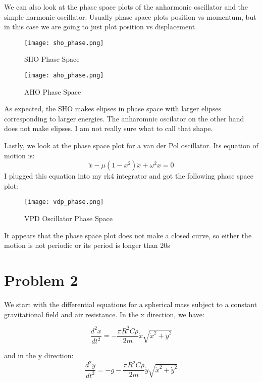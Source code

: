 \documentclass{article}
\begin{document}
We can also look at the phase space plots of the anharmonic oscillator and the simple harmonic oscillator. Usually phase space plots position vs momentum, but in this case we are going to just plot position vs displacement

\begin{figure}
    \centering
    \texttt{[image: sho\_phase.png]}
    \caption{SHO Phase Space}
    \label{fig:3}
\end{figure}

\begin{figure}
    \centering
    \texttt{[image: aho\_phase.png]}
    \caption{AHO Phase Space}
    \label{fig:4}
\end{figure}


As expected, the SHO makes elipses in phase space with larger elipses corresponding to larger energies. The anharomnic oscilator on the other hand does not make elipses. I am not really sure what to call that shape.

Lastly, we look at the phase space plot for a van der Pol oscillator. Its equation of motion is:
\begin{equation}
    \ddot{x}-\mu(1-x^2)\dot{x}+\omega^2 x=0
\end{equation}
I plugged this equation into my rk4 integrator and got the following phase space plot:

\begin{figure}
    \centering
    \texttt{[image: vdp\_phase.png]}
    \caption{VPD Oscillator Phase Space}
    \label{fig:enter-label}
\end{figure}
It appears that the phase space plot does not make a closed curve, so either the motion is not periodic or its period is longer than 20s


\section{Problem 2}

We start with the differential equations for a spherical mass subject to  a constant gravitational field and air resistance. In the x direction, we have:

\begin{equation}
    \frac{d^2x}{dt^2}=-\frac{\pi R^2 C\rho}{2m}\dot{x}\sqrt{\dot{x}^2+\dot{y}^2}
\end{equation}

and in the y direction:
\begin{equation}
    \frac{d^2y}{dt^2} =-g- \frac{\pi R^2C\rho}{2m} \dot{y}\sqrt{\dot{x}^2+\dot{y}^2}
\end{equation}
\end{document}
